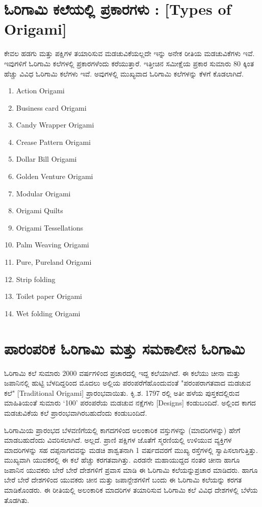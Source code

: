 \section*{ಓರಿಗಾಮಿ ಕಲೆಯಲ್ಲಿ ಪ್ರಕಾರಗಳು : [Types of Origami]}
ಕೇವಲ ಹಡಗು ಮತ್ತು ಪಕ್ಷಿಗಳ ತಯಾರಿಸುವ ಮಡಚುವಿಕೆಯಲ್ಲದೇ ಇನ್ನು ಅನೇಕ ರೀತಿಯ ಮಡಚುವಿಕೆಗಳು ಇವೆ. ಇವುಗಳಿಗೆ ಓರಿಗಾಮಿ ಕಲೆಗಳಲ್ಲಿ ಪ್ರಕಾರಗಳೆಂದು ಕರೆಯುತ್ತಾರೆ. ಇತ್ತೀಚಿನ ಸಮೀಕ್ಷೆಯ ಪ್ರಕಾರ ಸುಮಾರು 80 ಕ್ಕಿಂತ ಹೆಚ್ಚು ವಿವಿಧ ಓರಿಗಾಮಿ ಕಲೆಗಳು ಇವೆ. ಅವುಗಳಲ್ಲಿ ಮುಖ್ಯವಾದ ಓರಿಗಾಮಿ ಕಲೆಗಳನ್ನು ಕೆಳಗೆ ಕೊಡಲಾಗಿದೆ. 
\begin{enumerate}
\item Action Origami
\item Business card Origami
\item Candy Wrapper Origami 
\item Crease Pattern Origami 
\item Dollar Bill Origami 
\item Golden Venture Origami 
\item Modular Origami 
\item Origami  Quilts
\item Origami  Tessellations
\item Palm Weaving Origami 
\item Pure, Pureland Origami 
\item Strip folding 
\item Toilet paper Origami 
\item Wet folding Origami 
\end{enumerate}

\section{ಪಾರಂಪರಿಕ ಓರಿಗಾಮಿ ಮತ್ತು ಸಮಕಾಲೀನ ಓರಿಗಾಮಿ}\label{sec1.2}%
ಓರಿಗಾಮಿ ಕಲೆ ಸುಮಾರು 2000 ವರ್ಷಗಳಿಂದ ಪ್ರಚಾರದಲ್ಲಿ ಇದ್ದ ಕಲೆಯಾಗಿದೆ. ಈ ಕಲೆಯು ಚೀನಾ ಮತ್ತು ಜಪಾನಿನಲ್ಲಿ ಹುಟ್ಟಿ ಬೆಳದಿದ್ದರಿಂದ ಮೊದಲು ಅಲ್ಲಿಯ ಪರಂಪರೆಗೆ\break ಹೊಂದುವಂತೆ "ಪರಂಪರಾಗತವಾದ ಮಡಚುವ ಕಲೆ" [Traditional Origami] ಪ್ರಾರಂಭವಾಯಿತು. ಕಿೃ.ಶ. 1797 ರಲ್ಲಿ ಅತೀ ಹಳೆಯ ಪುಸ್ತಕದಲ್ಲಿರುವ ಮಾಹಿತಿಯಂತೆ ಸುಮಾರು `100' ಪರಂಪರೆಯ ಮಡಚುವ ನಕ್ಷೆಗಳು [Designs] ಕಂಡುಬಂದಿದೆ. ಅಲ್ಲಿಂದ ಕಾಗದ ಮಡಚುವಿಕೆಯ ಕಲೆ ಪ್ರಾರಂಭವಾಗಿರಬಹುದೆಂದು ಕಂಡುಬಂದಿದೆ. 


ಓರಿಗಾಮಿಯ ಪ್ರಾರಂಭದ ಬೆಳವಣಿಗೆಯಲ್ಲಿ ಕಾಗದಗಳಿಂದ ಅಲಂಕಾರಿಕ ವಸ್ತುಗಳನ್ನು (ಮಾದರಿಗಳನ್ನು) ಹೇಗೆ ಮಾಡಬಹುದೆಂದು ವಿವರಿಸಲಾಗಿದೆ. ಅಲ್ಲದೆ. ಪ್ರಾಣಿ ಪಕ್ಷಿಗಳ ಜೊತೆಗೆ ಸ್ಮರಣಿಯಲ್ಲಿ ಉಳಿಯುವ ವ್ಯಕ್ತಿಗಳ ಮಾದರಿಗಳನ್ನು ಸಹ ದಪ್ಪನಾಗದವನ್ನು ಮಡಚಿ ಶಾಶ್ವತನಾಗಿ 1 ವರ್ಷದವರಗೆ ಮುಖ್ಯ ರಸ್ತೆಗಳಲ್ಲಿ ಸ್ವಾಪಿಸಲಾಗುತ್ತಿತ್ತು. ಮುಖ್ಯವಾಗಿ ಯುವಕರಲ್ಲಿ ಈ ಕಲೆ ಹೆಚ್ಚು ಕರಗತವಾಗಿತ್ತು. ಎರಡನೇ ಮಹಾಯುದ್ದದ ನಂತರ ಚೀನಾ ಹಾಗೂ ಜಪಾನಿನ ಯುವಕರು ಬೇರೆ ಬೇರೆ ದೇಶಗಳಿಗೆ ಪ್ರವಾಸ ಮಾಡಿ ಈ ಓರಿಗಾಮಿ ಕಲೆಯನ್ನು\break ಪ್ರಚಾರ ಮಾಡಿದರು. ಹಾಗೂ ಬೇರೆ ಬೇರೆ ದೇಶಗಳಿಂದ ಯುವಕರು ಚೀನ  ಮತ್ತು ಜಪಾನ್\break ದೇಶಗಳಿಗೆ ಬಂದು ಈ ಓರಿಗಾಮಿ ಕಲೆಯನ್ನು ಕರಗತ ಮಾಡಿಕೊಂಡರು. ಈ ರೀತಿಯಲ್ಲಿ ಅಲಂಕಾರಿಕ ಮಾದರಿಗಳ ತಯಾರಿಸುವ ಓರಿಗಾಮಿ ಕಲೆ ವಿವಿಧ ದೇಶಗಳಲ್ಲಿ ಬೆಳೆಯ ತೊಡಗಿತು. 

